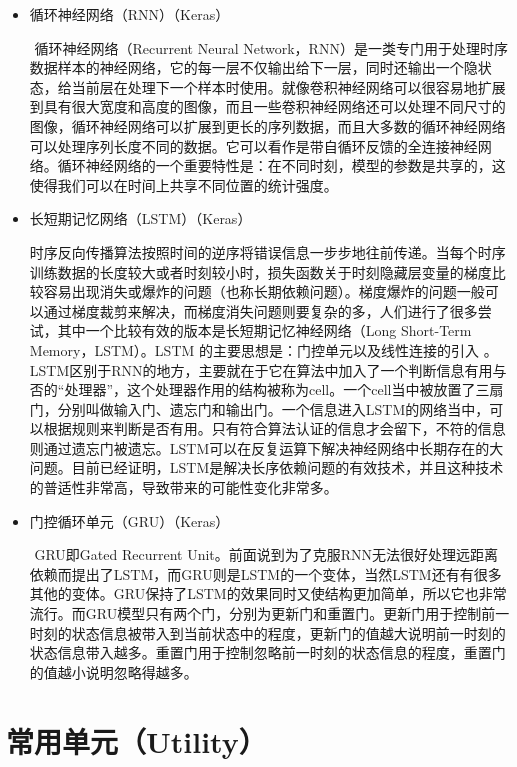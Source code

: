 \documentclass{progbookcn}
\begin{document}
\begin{itemize}
\item 循环神经网络（RNN）（Keras）

  ​	循环神经网络（Recurrent Neural Network，RNN）是一类专门用于处理时序数据样本的神经网络，它的每一层不仅输出给下一层，同时还输出一个隐状态，给当前层在处理下一个样本时使用。就像卷积神经网络可以很容易地扩展到具有很大宽度和高度的图像，而且一些卷积神经网络还可以处理不同尺寸的图像，循环神经网络可以扩展到更长的序列数据，而且大多数的循环神经网络可以处理序列长度不同的数据。它可以看作是带自循环反馈的全连接神经网络。循环神经网络的一个重要特性是：在不同时刻，模型的参数是共享的，这使得我们可以在时间上共享不同位置的统计强度。

\item 长短期记忆网络（LSTM）（Keras）

  ​	时序反向传播算法按照时间的逆序将错误信息一步步地往前传递。当每个时序训练数据的长度较大或者时刻较小时，损失函数关于时刻隐藏层变量的梯度比较容易出现消失或爆炸的问题（也称长期依赖问题）。梯度爆炸的问题一般可以通过梯度裁剪来解决，而梯度消失问题则要复杂的多，人们进行了很多尝试，其中一个比较有效的版本是长短期记忆神经网络（Long Short-Term Memory，LSTM）。LSTM 的主要思想是：门控单元以及线性连接的引入 。LSTM区别于RNN的地方，主要就在于它在算法中加入了一个判断信息有用与否的“处理器”，这个处理器作用的结构被称为cell。一个cell当中被放置了三扇门，分别叫做输入门、遗忘门和输出门。一个信息进入LSTM的网络当中，可以根据规则来判断是否有用。只有符合算法认证的信息才会留下，不符的信息则通过遗忘门被遗忘。LSTM可以在反复运算下解决神经网络中长期存在的大问题。目前已经证明，LSTM是解决长序依赖问题的有效技术，并且这种技术的普适性非常高，导致带来的可能性变化非常多。

\item 门控循环单元（GRU）（Keras）

  ​	GRU即Gated Recurrent Unit。前面说到为了克服RNN无法很好处理远距离依赖而提出了LSTM，而GRU则是LSTM的一个变体，当然LSTM还有有很多其他的变体。GRU保持了LSTM的效果同时又使结构更加简单，所以它也非常流行。而GRU模型只有两个门，分别为更新门和重置门。更新门用于控制前一时刻的状态信息被带入到当前状态中的程度，更新门的值越大说明前一时刻的状态信息带入越多。重置门用于控制忽略前一时刻的状态信息的程度，重置门的值越小说明忽略得越多。

\end{itemize}


\section{常用单元（Utility）}
\end{document}
